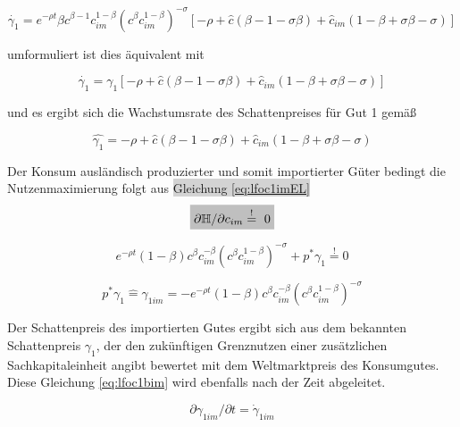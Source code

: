 	\begin{equation}
		\dot{\gamma_1}=e^{-\rho t}\beta c^{\beta-1}c_{im}^{1-\beta}(c^\beta c_{im}^{1-\beta})^{-\sigma}[-\rho+\hat{c}(\beta-1-\sigma\beta)+\hat{c}_{im}(1-\beta+\sigma\beta-\sigma)]\label{eq:lfoc1cEL}
	\end{equation}


umformuliert ist dies äquivalent mit

	\begin{equation*}
		\dot{\gamma_1}=\gamma_1[-\rho+\hat{c}(\beta-1-\sigma\beta)+\hat{c}_{im}(1-\beta+\sigma\beta-\sigma)]\label{eq:foc1cEL}
	\end{equation*}


und es ergibt sich die Wachstumsrate des Schattenpreises für Gut 1 gemä{\ss} 


	\begin{equation}
		\hat{\gamma_1}=-\rho+\hat{c}(\beta-1-\sigma\beta)+\hat{c}_{im}(1-\beta+\sigma\beta-\sigma)\label{eq:foc1dEL}
	\end{equation}


Der Konsum ausländisch produzierter und somit importierter Güter bedingt die Nutzenmaximierung folgt aus \colorbox{lightgray}{Gleichung \eqref{eq:lfoc1imEL}} \\


	\begin{equation*}
		\colorbox{lightgray}{$\partial\mathbb{H}/\partial c_{im}\overset{!}{=}~0$}
	\end{equation*}


	\begin{equation}
		e^{-\rho t}(1-\beta)c^\beta c_{im}^{-\beta}(c^\beta c_{im}^{1-\beta})^{-\sigma}+p^*\gamma_{1}\overset{!}{=}0\label{eq:lfoc1aim}
	\end{equation}

	
	\begin{equation}
		p^*\gamma_{1}\hat{=} \gamma_{1im}=-e^{-\rho t}(1-\beta) c^{\beta}c_{im}^{-\beta}(c^\beta c_{im}^{1-\beta})^{-\sigma}\label{eq:lfoc1bim}
	\end{equation}


Der Schattenpreis des importierten Gutes ergibt sich aus dem bekannten Schattenpreis $\gamma_1$, der den zukünftigen Grenznutzen einer zusätzlichen Sachkapitaleinheit angibt bewertet mit dem Weltmarktpreis des Konsumgutes. Diese Gleichung \eqref{eq:lfoc1bim} wird ebenfalls nach der Zeit abgeleitet.

	
	\begin{equation}
		\partial\gamma_{1im}/\partial t=\dot{\gamma}_{1im}
	\end{equation}


